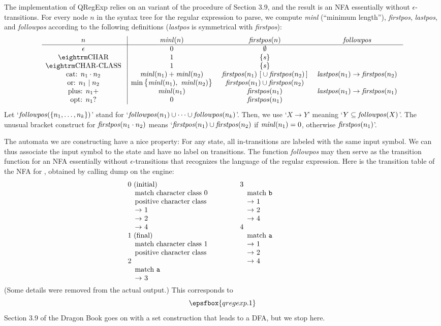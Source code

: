 The implementation of {\sf QRegExp} relies on an variant of the procedure of Section 3.9, and the result is an NFA essentially without $\epsilon$-transitions.  For every node $n$ in the syntax tree for the regular expression to parse, we compute {\it minl} (``minimum length''), {\it firstpos}, {\it lastpos}, and {\it followpos\/} according to the following definitions ({\it lastpos\/} is symmetrical with {\it firstpos\/}):  $$\vbox{\halign{\g{#}\vrule && \g{$#$} \cr
  $n$                   & {\it minl}(n)     & {\it firstpos}(n)                 & {\it followpos} \cr
\noalign{\hrule}
  $\epsilon$            & 0                 & \emptyset \cr
  \tok{char}            & 1                 & \{s\} \cr
  \tok{char-class}      & 1                 & \{s\} \cr
  cat: $n_1 \cdot n_2$  & {\it minl}(n_1) +
                          {\it minl}(n_2)   & {\it firstpos}(n_1)
                                              \ [{} \cup {\it firstpos}(n_2)\,] & {\it lastpos}(n_1) \rightarrow
                                                                                  {\it firstpos}(n_2) \cr
  or: $n_1 \mid n_2$    & \min\smash{\bigl\{}{\it minl}(n_1),
                          \ {\it minl}(n_2)\smash{\bigr\}}
                                            & {\it firstpos}(n_1) \cup
                                              {\it firstpos}(n_2) \cr
  plus: $n_1+$          & {\it minl}(n_1)   & {\it firstpos}(n_1)               & {\it lastpos}(n_1) \rightarrow
                                                                                  {\it firstpos}(n_1) \cr
  opt: $n_1?$           & 0                 & {\it firstpos}(n_1) \cr
}}$$  Let `${\it followpos}(\{n_1, \ldots, n_k\})$' stand for `${\it followpos}(n_1) \cup \cdots \cup {\it followpos}(n_k)$'.  Then, we use `$X \rightarrow Y$' meaning `$Y \subseteq {\it followpos}(X)$'.  The unusual bracket construct for ${\it firstpos}(n_1 \cdot n_2)$ means `${\it firstpos}(n_1) \cup {\it firstpos}(n_2)$ if ${\it minl}(n_1) = 0$, otherwise ${\it firstpos}(n_1)$'.

The automata we are constructing have a nice property:  For any state, all in-transitions are labeled with the same input symbol.  We can thus associate the input symbol to the state and have no label on transitions.  The function {\it followpos\/} may then serve as the transition function for an NFA essentially without $\epsilon$-transitions that recognizes the language of the regular expression.  Here is the transition table of the NFA for , obtained by calling {\sf dump} on the engine:  $$\vtop{\hsize=0.4\hsize\obeylines
  0 (initial)
  \quad match character class 0
  \quad positive character class
  \quad $\rightarrow$ 1
  \quad $\rightarrow$ 2
  \quad $\rightarrow$ 4
  1 (final)
  \quad match character class 1
  \quad positive character class
  2
  \quad match {\tt a}
  \quad $\rightarrow$ 3
}\qquad\vtop{\hsize=0.4\hsize\obeylines
  3
  \quad match {\tt b}
  \quad $\rightarrow$ 1
  \quad $\rightarrow$ 2
  \quad $\rightarrow$ 4
  4
  \quad match {\tt a}
  \quad $\rightarrow$ 1
  \quad $\rightarrow$ 2
  \quad $\rightarrow$ 4
}$$  (Some details were removed from the actual output.)  This corresponds to $$\epsfbox{qregexp.1}$$  Section 3.9 of the Dragon Book goes on with a set construction that leads to a DFA, but we stop here.

